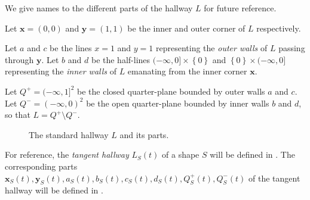 We give names to the different parts of the hallway \(L\) for future reference.

\begin{definition}

Let \(\mathbf{x} = (0, 0)\) and \(\mathbf{y} = (1, 1)\) be the inner and outer corner of \(L\) respectively.

\label{def:hallway-corners}
\end{definition}

\begin{definition}

Let \(a\) and \(c\) be the lines \(x=1\) and \(y=1\) representing the \emph{outer walls} of \(L\) passing through \(\mathbf{y}\). Let \(b\) and \(d\) be the half-lines \((-\infty, 0] \times \left\{ 0 \right\}\) and \(\left\{ 0 \right\} \times (-\infty, 0]\) representing the \emph{inner walls} of \(L\) emanating from the inner corner \(\mathbf{x}\).

\label{def:hallway-walls}
\end{definition}

\begin{definition}

Let \(Q^+ = (-\infty, 1]^2\) be the closed quarter-plane bounded by outer walls \(a\) and \(c\). Let \(Q^- = (-\infty, 0)^2\) be the open quarter-plane bounded by inner walls \(b\) and \(d\), so that \(L = Q^+ \setminus Q^-\).

\label{def:hallway-regions}
\end{definition}

\begin{figure}
\centering

\caption{The standard hallway \(L\) and its parts.}
\label{fig:hallway-detailed}
\end{figure}

For reference, the \emph{tangent hallway} \(L_S(t)\) of a shape \(S\) will be defined in . The corresponding parts \(\mathbf{x}_S(t), \mathbf{y}_S(t), a_S(t), b_S(t), c_S(t), d_S(t), Q^+_S(t), Q^-_S(t)\) of the tangent hallway will be defined in .
